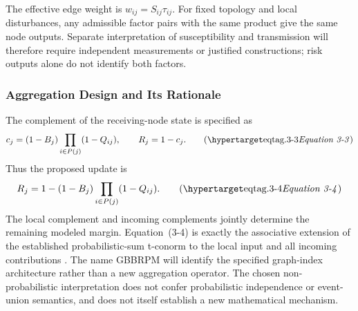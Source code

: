 \par\medskip
{\setlength{\fboxsep}{7pt}\setlength{\fboxrule}{0.7pt}%
\noindent{}\par}
\medskip

The effective edge weight is $w_{ij}=S_{ij}\tau_{ij}$. For fixed topology
and local disturbances, any admissible factor pairs with the same product
give the same node outputs. Separate interpretation of susceptibility and
transmission will therefore require independent measurements or justified
constructions; risk outputs alone do not identify both factors.

\subsubsection{Aggregation Design and Its Rationale}

The complement of the receiving-node state is specified as
\[
c_j=(1-B_j)\prod_{i\in P(j)}(1-Q_{ij}),\qquad R_j=1-c_j.
\eqtag{3-3}
\]
Thus the proposed update is
\[
R_j=1-(1-B_j)\prod_{i\in P(j)}(1-Q_{ij}).
\eqtag{3-4}
\]
The local complement and incoming complements jointly determine the
remaining modeled margin. Equation~(3-4) is exactly the associative
extension of the established probabilistic-sum t-conorm to the local
input and all incoming contributions \citep{klement2004}. The name
GBBRPM will identify the specified graph-index architecture rather than
a new aggregation operator. The chosen non-probabilistic interpretation
does not confer probabilistic independence or event-union semantics,
and does not itself establish a new mathematical mechanism.

